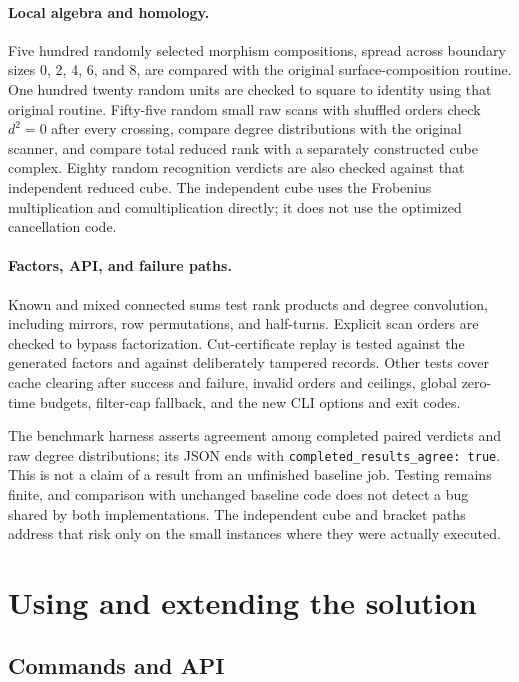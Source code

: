 \documentclass[11pt,letterpaper]{article}
\theoremstyle{definition}
\begin{document}
\paragraph{Local algebra and homology.}
Five hundred randomly selected morphism compositions, spread across boundary
sizes 0, 2, 4, 6, and 8, are compared with the original surface-composition
routine. One hundred twenty random units are checked to square to identity using
that original routine. Fifty-five random small raw scans with shuffled orders
check $d^2=0$ after every crossing, compare degree distributions with the
original scanner, and compare total reduced rank with a separately constructed
cube complex. Eighty random recognition verdicts are also checked against that
independent reduced cube. The independent cube uses the Frobenius multiplication
and comultiplication directly; it does not use the optimized cancellation code.

\paragraph{Factors, API, and failure paths.}
Known and mixed connected sums test rank products and degree convolution,
including mirrors, row permutations, and half-turns. Explicit scan orders are
checked to bypass factorization. Cut-certificate replay is tested against the
generated factors and against deliberately tampered records. Other tests cover
cache clearing after success and failure, invalid orders and ceilings, global
zero-time budgets, filter-cap fallback, and the new CLI options and exit codes.

The benchmark harness asserts agreement among completed paired verdicts and
raw degree distributions; its JSON ends with
\texttt{completed\_results\_agree: true}. This is not a claim of a result from
an unfinished baseline job. Testing remains finite, and comparison with
unchanged baseline code does not detect a bug shared by both implementations.
The independent cube and bracket paths address that risk only on the small
instances where they were actually executed.

\section[Usage and limitations]{Using and extending the solution}

\subsection{Commands and API}
\end{document}
